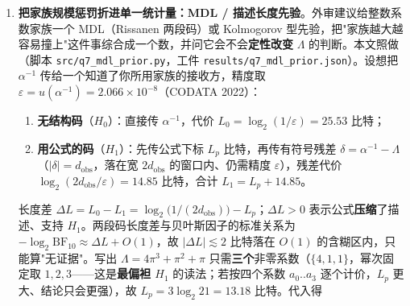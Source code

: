 \documentclass[12pt,a4paper]{article}
\begin{document}
\begin{enumerate}
  关键结果在第三行：把基从 $\pi$ 扩到 $\{\pi, e\}$、系数从 4 个扩到 6 个后，出现
  \[
    -1 - 2\pi + 5\pi^2 + 3\pi^3 - 2e + e^2 = 137.03615918,
    \qquad d = 1.600\times10^{-4},
  \]
  比 $\Lambda$ 好 $1.9$ 倍——$\Lambda$ \textbf{不再是全局最优}。而该家族下的偶然概率高达 $p = 0.729$：家族一大，"找到更好的拟合"几乎是必然事件。\textbf{但本文必须同时报告反方向的敏感性检验——缩小家族会让"$p\approx 0.13$ 不显著"翻转。}把系数界从 $\lvert a_i\rvert\le 10$ 分别收紧到 $\le 5$（$N=14\,640$）与 $\le 4$（$N=6\,560$，恰为 $\Lambda=(0,1,1,4)$ 自身的最大系数），在同一 Bonferroni 口径下$p$ 由 $0.132$ 降为 $0.0198$ 与 $0.0111$；解析式 $1-(1-2d/R)^N$ 给出 $0.0196$ 与 $0.0110$（本人 2026-10-16 重跑 $N$ 与值域 $R$ 实算，非引用他人结果）。也就是说：按这套算法，$\Lambda$ 在\textbf{更低复杂度界下反而是"显著"的}，而 $p$ 值随家族边界\textbf{双向漂移}（扩族升到 $0.17$--$0.73$，缩族降到 $0.011$）。因此"$p\approx 0.13$"不是该构造的内禀属性，任何单边引用都会误导。这从反面印证了本文的定性：$\Lambda$ 的"同族最优"是\textbf{家族规模}的产物，不是 $\alpha^{-1}$ 的几何必然。任何以"$\pi$ 的某个组合凑出 137"为卖点的构造，都必须在扩大家族后重新检验——而扩大之后总有更"好"的构造出现，这正是数值命理学（numerology）无法自证的结构性原因。
  \item \textbf{把家族规模惩罚折进单一统计量：MDL / 描述长度先验}。外审建议给整数系数家族一个 MDL（Rissanen 两段码）或 Kolmogorov 型先验，把"家族越大越容易撞上"这件事综合成一个数，并问它会不会\textbf{定性改变} $\Lambda$ 的判断。本文照做（脚本 \texttt{src/q7\_\allowbreak{}mdl\_\allowbreak{}prior.py}，工件 \texttt{results/q7\_\allowbreak{}mdl\_\allowbreak{}prior.json}）。设想把 $\alpha^{-1}$ 传给一个知道了你所用家族的接收方，精度取 $\varepsilon = u(\alpha^{-1}) = 2.066\times10^{-8}$（CODATA 2022）：
  \begin{enumerate}
    \item \textbf{无结构码}（$H_0$）：直接传 $\alpha^{-1}$，代价 $L_0 = \log_2(1/\varepsilon) = 25.53$ 比特；
    \item \textbf{用公式的码}（$H_1$）：先传公式下标 $L_p$ 比特，再传有符号残差 $\delta = \alpha^{-1}-\Lambda$（$|\delta| = d_{\mathrm{obs}}$，落在宽 $2d_{\mathrm{obs}}$ 的窗口内、仍需精度 $\varepsilon$），残差代价 $\log_2(2d_{\mathrm{obs}}/\varepsilon) = 14.85$ 比特，合计 $L_1 = L_p + 14.85$。
  \end{enumerate}
  长度差 $\Delta L = L_0 - L_1 = \log_2\!\bigl(1/(2d_{\mathrm{obs}})\bigr) - L_p$；$\Delta L>0$ 表示公式\textbf{压缩}了描述、支持 $H_1$。两段码长度差与贝叶斯因子的标准关系为 $-\log_2 \mathrm{BF}_{10} \approx \Delta L + O(1)$，故 $|\Delta L| \lesssim 2$ 比特落在 $O(1)$ 的含糊区内，只能算"无证据"。写出 $\Lambda = 4\pi^3+\pi^2+\pi$ 只需\textbf{三个}非零系数（$\{4,1,1\}$，幂次固定取 $1,2,3$——这是\textbf{最偏袒 $H_1$} 的读法；若按四个系数 $a_0..a_3$ 逐个计价，$L_p$ 更大、结论只会更强），故 $L_p = 3\log_2 21 = 13.18$ 比特。代入得

\end{enumerate}
\end{document}
